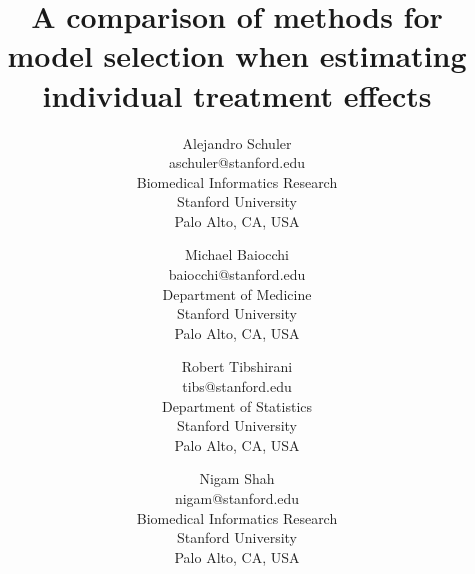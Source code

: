 \documentclass{article}
\begin{document}
\title{A comparison of methods for model selection when estimating individual treatment effects}

\author{Alejandro Schuler \\
	aschuler@stanford.edu \\
       Biomedical Informatics Research\\
       Stanford University\\
       Palo Alto, CA, USA 
          \and
     Michael Baiocchi \\
     baiocchi@stanford.edu \\
       Department of Medicine\\
       Stanford University\\
       Palo Alto, CA, USA 
       \and
            Robert Tibshirani \\
     tibs@stanford.edu \\
       Department of Statistics\\
       Stanford University\\
       Palo Alto, CA, USA 
	\and
     Nigam Shah \\
     nigam@stanford.edu \\
       Biomedical Informatics Research\\
       Stanford University\\
       Palo Alto, CA, USA }

\maketitle



 

% 
% 
% 





\end{document}
